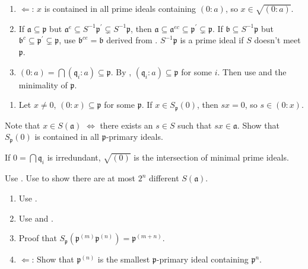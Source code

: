 \begin{exercise}\label{ex4.9}
	\begin{enumerate}[label=(\roman*),ref=\theexercise(\roman*)]
		\item $\Leftarrow$: $x$ is contained in all prime ideals containing $(0:a)$, so $x\in\sqrt{(0:a)}$.
		\item If $\mathfrak{a}\subseteq\mathfrak{p}$ but $\mathfrak{a}^e\subseteq S^{-1}\mathfrak{p}^\prime\subsetneq S^{-1}\mathfrak{p}$, then $\mathfrak{a}\subseteq\mathfrak{a}^{ec}\subseteq\mathfrak{p}^\prime\subsetneq\mathfrak{p}$. If $\mathfrak{b}\subseteq S^{-1}\mathfrak{p}$ but $\mathfrak{b}^c\subseteq\mathfrak{p}^\prime\subsetneq\mathfrak{p}$, use $\mathfrak{b}^{ce}=\mathfrak{b}$ derived from . $S^{-1}\mathfrak{p}$ is a prime ideal if $S$ doesn't meet $\mathfrak{p}$.
		\item $(0:a)=\bigcap\left(\mathfrak{q}_i:a\right)\subseteq\mathfrak{p}$. By , $\left(\mathfrak{q}_i:a\right)\subseteq\mathfrak{p}$ for some $i$. Then use  and the minimality of $\mathfrak{p}$.
	\end{enumerate}
\end{exercise}

\begin{exercise}\label{ex4.10}
	\begin{enumerate}
		\item[(iv)] Let $x\neq0$, $(0:x)\subseteq\mathfrak{p}$ for some $\mathfrak{p}$. If $x\in S_\mathfrak{p}(0)$, then $sx=0$, so $s\in(0:x)$.
	\end{enumerate}
\end{exercise}

\begin{exercise}\label{ex4.11}
	Note that $x\in S(\mathfrak{a})$ $\Leftrightarrow$ there exists an $s\in S$ such that $sx\in\mathfrak{a}$. Show that $S_\mathfrak{p}(0)$ is contained in all $\mathfrak{p}$-primary ideals.\par
	If $0=\bigcap\mathfrak{q}_i$ is irredundant, $\sqrt{(0)}$ is the intersection of minimal prime ideals.
\end{exercise}

\begin{exercise}\label{ex4.12}
	Use . Use  to show there are at most $2^n$ different $S(\mathfrak{a})$.
\end{exercise}

\begin{exercise}\label{ex4.13}
	\begin{enumerate}[label=(\roman*),ref=\theexercise(\roman*)]
		\item Use .
		\item Use  and .
		\item Proof that $S_\mathfrak{p}\left(\mathfrak{p}^{(m)}\mathfrak{p}^{(n)}\right)=\mathfrak{p}^{(m+n)}$.
		\item$\Leftarrow$: Show that $\mathfrak{p}^{(n)}$ is the smallest $\mathfrak{p}$-primary ideal containing $\mathfrak{p}^n$.
	\end{enumerate}
\end{exercise}

